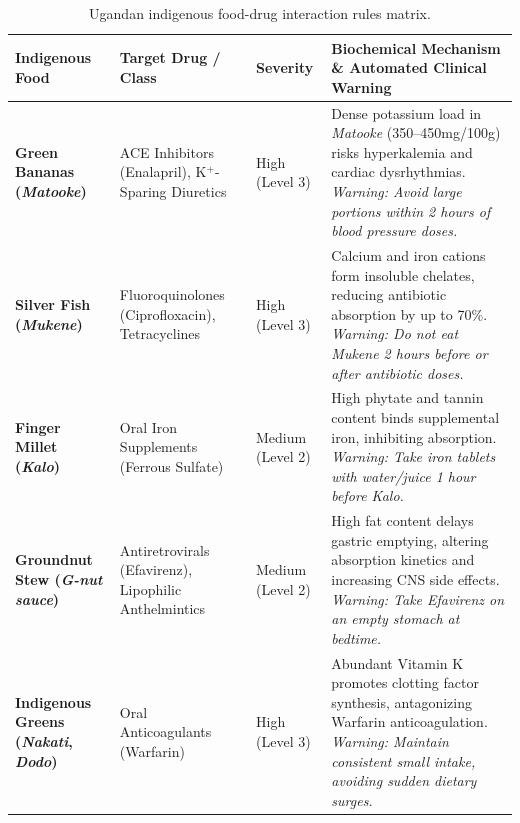 \begin{table}[!htbp]
  \centering
  \caption{Ugandan indigenous food-drug interaction rules matrix.}
  \label{tab:food_interaction_matrix}
  \footnotesize
  \setlength{\tabcolsep}{3pt}
  \begin{tabularx}{\textwidth}{@{} >{\raggedright\arraybackslash}p{2.2cm} >{\raggedright\arraybackslash}p{2.8cm} >{\centering\arraybackslash}p{1.3cm} >{\raggedright\arraybackslash}X @{}}
    \toprule
    \textbf{Indigenous Food} & \textbf{Target Drug / Class} & \textbf{Severity} & \textbf{Biochemical Mechanism \& Automated Clinical Warning} \\
    \midrule
    \textbf{Green Bananas (\textit{Matooke})} & ACE Inhibitors (Enalapril), K$^+$-Sparing Diuretics & High (Level 3) & Dense potassium load in \textit{Matooke} (350--450mg/100g) risks hyperkalemia and cardiac dysrhythmias. \newline \textit{Warning: Avoid large portions within 2 hours of blood pressure doses.} \\
    \midrule
    \textbf{Silver Fish (\textit{Mukene})} & Fluoroquinolones (Ciprofloxacin), Tetracyclines & High (Level 3) & Calcium and iron cations form insoluble chelates, reducing antibiotic absorption by up to 70\%. \newline \textit{Warning: Do not eat Mukene 2 hours before or after antibiotic doses.} \\
    \midrule
    \textbf{Finger Millet (\textit{Kalo})} & Oral Iron Supplements (Ferrous Sulfate) & Medium (Level 2) & High phytate and tannin content binds supplemental iron, inhibiting absorption. \newline \textit{Warning: Take iron tablets with water/juice 1 hour before Kalo.} \\
    \midrule
    \textbf{Groundnut Stew (\textit{G-nut sauce})} & Antiretrovirals (Efavirenz), Lipophilic Anthelmintics & Medium (Level 2) & High fat content delays gastric emptying, altering absorption kinetics and increasing CNS side effects. \newline \textit{Warning: Take Efavirenz on an empty stomach at bedtime.} \\
    \midrule
    \textbf{Indigenous Greens (\textit{Nakati}, \textit{Dodo})} & Oral Anticoagulants (Warfarin) & High (Level 3) & Abundant Vitamin K promotes clotting factor synthesis, antagonizing Warfarin anticoagulation. \newline \textit{Warning: Maintain consistent small intake, avoiding sudden dietary surges.} \\
    \bottomrule
  \end{tabularx}
\end{table}